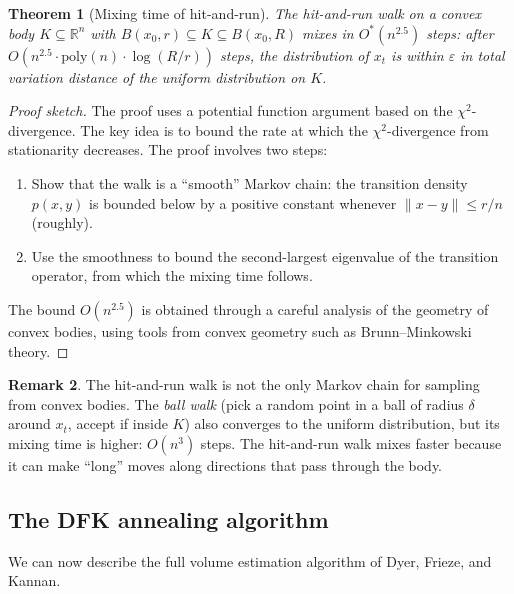 \documentclass[twoside,12pt]{book}
\theoremstyle{plain}
\newtheorem{theorem}{Theorem}[chapter]
\theoremstyle{definition}
\newtheorem{remark}[theorem]{Remark}
\theoremstyle{remark}
\begin{document}
\begin{theorem}[Mixing time of hit-and-run]
\label{thm:hit-run-mix}
The hit-and-run walk on a convex body $K \subseteq \mathbb{R}^n$ with $B(x_0, r) \subseteq K \subseteq B(x_0, R)$ mixes in $O^*(n^{2.5})$ steps: after $O(n^{2.5} \cdot \text{poly}(n) \cdot \log(R/r))$ steps, the distribution of $x_t$ is within $\varepsilon$ in total variation distance of the uniform distribution on $K$.
\end{theorem}

\begin{proof}[Proof sketch]
The proof uses a potential function argument based on the $\chi^2$-divergence. The key idea is to bound the rate at which the $\chi^2$-divergence from stationarity decreases. The proof involves two steps:
\begin{enumerate}[nosep]
    \item Show that the walk is a ``smooth'' Markov chain: the transition density $p(x, y)$ is bounded below by a positive constant whenever $\|x - y\| \leq r/n$ (roughly).
    \item Use the smoothness to bound the second-largest eigenvalue of the transition operator, from which the mixing time follows.
\end{enumerate}
The bound $O(n^{2.5})$ is obtained through a careful analysis of the geometry of convex bodies, using tools from convex geometry such as Brunn--Minkowski theory.
\end{proof}

\begin{remark}
The hit-and-run walk is not the only Markov chain for sampling from convex bodies. The \emph{ball walk} (pick a random point in a ball of radius $\delta$ around $x_t$, accept if inside $K$) also converges to the uniform distribution, but its mixing time is higher: $O(n^3)$ steps. The hit-and-run walk mixes faster because it can make ``long'' moves along directions that pass through the body.
\end{remark}

\subsection{The DFK annealing algorithm}

We can now describe the full volume estimation algorithm of Dyer, Frieze, and Kannan.
\end{document}
